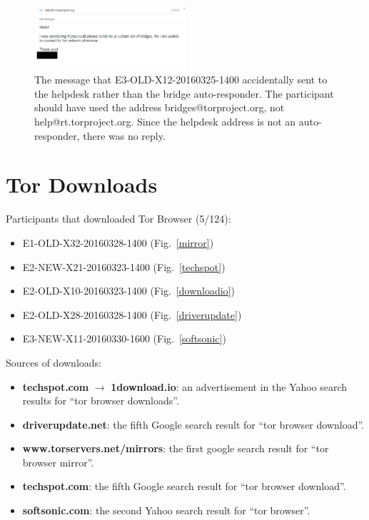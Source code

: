 \documentclass[USenglish,oneside,twocolumn]{article}
\begin{document}
\begin{figure}[h]
\includegraphics[width=0.5\textwidth]{../experiment/processing/failed-participants/20160328-133857-bridgeresponder-redacted.png}
\caption{The message that E3-OLD-X12-20160325-1400 accidentally sent to the helpdesk rather than the bridge auto-responder. The participant should have used the address bridges@torproject.org, not help@rt.torproject.org. Since the helpdesk address is not an auto-responder, there was no reply.}
\label{autoresponder2}
\end{figure} 

\section{Tor Downloads}
\label{tor-downloads}

Participants that downloaded Tor Browser (5/124): 
\begin{itemize}
\item E1-OLD-X32-20160328-1400 (Fig.~\ref{mirror})
\item E2-NEW-X21-20160323-1400 (Fig.~\ref{techspot})
\item E2-OLD-X10-20160323-1400 (Fig.~\ref{downloadio})
\item E2-OLD-X28-20160328-1400 (Fig.~\ref{driverupdate})
\item E3-NEW-X11-20160330-1600 (Fig.~\ref{softsonic})
\end{itemize} 

Sources of downloads: 
\begin{itemize}
\item {\bfseries techspot.com} $\rightarrow$ {\bfseries 1download.io}: an advertisement in the Yahoo search results for ``tor browser downloads''.
\item {\bfseries driverupdate.net}: the fifth Google search result for ``tor browser download''.
\item {\bfseries www.torservers.net/mirrors}: the first google search result for ``tor browser mirror''.
\item {\bfseries techspot.com}: the fifth Google search result for ``tor browser download''.
\item {\bfseries softsonic.com}: the second Yahoo search result for ``tor browser''.
\end{itemize}
\end{document}
